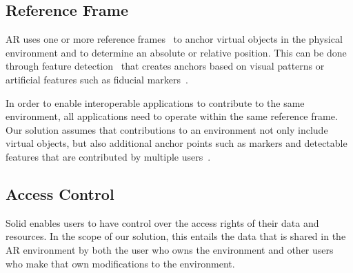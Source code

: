 \subsection{Reference Frame}
AR uses one or more reference frames~\cite{mou2004frames} to anchor virtual objects in the physical environment and to determine an absolute or relative position. This can be done through feature detection~\cite{10.1145/3301275.3302278} that creates anchors based on visual patterns or artificial features such as fiducial markers~\cite{kalaitzakis2021fiducial}.

In order to enable interoperable applications to contribute to the same environment, all applications need to operate within the same reference frame. Our solution assumes that contributions to an environment not only include virtual objects, but also additional anchor points such as markers and detectable features that are contributed by multiple users~\cite{fidmark}.

\subsection{Access Control}
Solid enables users to have control over the access rights of their data and resources. In the scope of our solution, this entails the data that is shared in the AR environment by both the user who owns the environment and other users who make that own modifications to the environment.